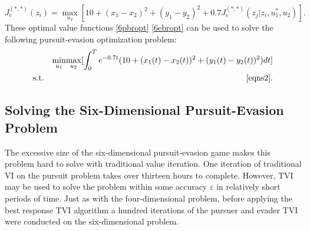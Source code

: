\begin{equation}\label{6ebropt}
J_e^{(*,*)}(z_i)= \underset{u_2 }{\operatorname{max }}[10+(x_1-x_2)^2+(y_1-y_2)^2+0.7 J_e^{(*,*)}(z_j|z_i,u_1^*,u_2)].
\end{equation}    
These optimal value functions \ref{6pbropt} \ref{6ebropt} can be used to solve the following pursuit-evasion optimization problem:
\begin{eqnarray}\label{6opt}
&&\underset{u_1 }{\operatorname{min }}\underset{u_2 }{\operatorname{max }}[\int_{0}^{T}e^{-0.7t}(10+(x_1(t)-x_2(t))^2+(y_1(t)-y_2(t))^2)dt]\\
&\textnormal{s.t.}&\ref{eqns2}.
\end{eqnarray}

\subsection{Solving the Six-Dimensional Pursuit-Evasion Problem}
The excessive size of the six-dimensional pursuit-evasion game makes this problem hard to solve with traditional value iteration. One iteration of traditional VI on the pursuit problem takes over thirteen hours to complete. However, TVI may be used to solve the problem within some accuracy $\varepsilon$ in relatively short periods of time. Just as with the four-dimensional problem, before applying the best response TVI algorithm a hundred iterations of the pursuer and evader TVI were conducted on the six-dimensional problem. 

